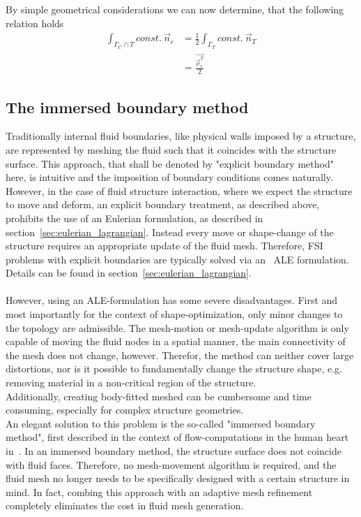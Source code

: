 \documentclass[../main.tex]{subfiles}
\begin{document}
By simple geometrical considerations we can now determine, that the following relation holds
\begin{align}\label{eq:final_relation}
\int_{\Gamma_C \cap T} const.~\vec{n}_c &= \frac{1}{2}\int_{\Gamma_T} const.~\vec{n}_T \\
                                        &= \frac{\vec{\vec{\nu}_i^T}}{2}
\end{align}




\subsection{The immersed boundary method}\label{sec:immersed_boundaries}
Traditionally internal fluid boundaries, like physical walls imposed by a structure, are represented by meshing the fluid such that it coincides with the structure surface. This approach, that shall be denoted by "explicit boundary method" here, is intuitive and the imposition of boundary conditions comes naturally.
However, in the case of fluid structure interaction, where we expect the structure to move and deform, an explicit boundary treatment, as described above, prohibits the use of an Eulerian formulation, as described in section~\ref{sec:eulerian_lagrangian}. Instead every move or shape-change of the structure requires an appropriate update of the fluid mesh. Therefore, \ac{FSI} problems with explicit boundaries are typically solved via an \
\ac{ALE} formulation. Details can be found in section~\ref{sec:eulerian_lagrangian}.\\
  \\
However, using an \ac{ALE}-formulation has some severe disadvantages. First and most importantly for the context of shape-optimization, only minor changes to the topology are admissible. The mesh-motion or mesh-update algorithm is only capable of moving the fluid nodes in a spatial manner, the main connectivity of the mesh does not change, however. Therefor, the method can neither cover large distortions, nor is it possible to fundamentally change the structure shape, e.g. removing material in a non-critical region of the structure.\\
Additionally, creating body-fitted meshed can be cumbersome and time consuming, especially for complex structure geometries.\\
An elegant solution to this problem is the so-called "immersed boundary method", first described in the context of flow-computations in the human heart in~\cite{Peskin1972}. In an immersed boundary method, the structure surface does not coincide with fluid faces. Therefore, no mesh-movement algorithm is required, and the fluid mesh no longer needs to be specifically designed with a certain structure in mind. In fact, combing this approach with an adaptive mesh refinement completely eliminates the cost in fluid mesh generation.\\
\end{document}
